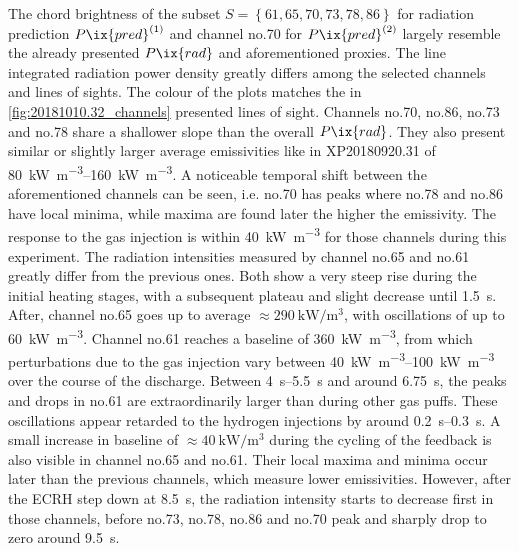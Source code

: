             The chord brightness of the subset $S=\left\{61, 65, 70, 73, 78, 86\right\}$ for radiation prediction $P\ix{pred}^{\left(1\right)}$ and channel no.70 for $P\ix{pred}^{\left(2\right)}$ largely resemble the already presented $P\ix{rad}$ and aforementioned proxies. The line integrated radiation power density greatly differs among the selected channels and lines of sights. The colour of the plots matches the in \cref{fig:20181010.32_channels} presented lines of sight. Channels no.70, no.86, no.73 and no.78 share a shallower slope than the overall $P\ix{rad}$. They also present similar or slightly larger average emissivities like in XP20180920.31 of \SIrange{80}{160}{\kilo\watt\per\cubic\meter}. A noticeable temporal shift between the aforementioned channels can be seen, i.e. no.70 has peaks where no.78 and no.86 have local minima, while maxima are found later the higher the emissivity. The response to the gas injection is within \SI{40}{\kilo\watt\per\cubic\meter} for those channels during this experiment. The radiation intensities measured by channel no.65 and no.61 greatly differ from the previous ones. Both show a very steep rise during the initial heating stages, with a subsequent plateau and slight decrease until \SI{1.5}{\second}. After, channel no.65 goes up to average $\approx\SI{290}{\kilo\watt\per\cubic\meter}$, with oscillations of up to \SI{60}{\kilo\watt\per\cubic\meter}. Channel no.61 reaches a baseline of \SI{360}{\kilo\watt\per\cubic\meter}, from which perturbations due to the gas injection vary between \SIrange{40}{100}{\kilo\watt\per\cubic\meter} over the course of the discharge. Between \SIrange{4}{5.5}{\second} and around \SI{6.75}{\second}, the peaks and drops in no.61 are extraordinarily larger than during other gas puffs. These oscillations appear retarded to the hydrogen injections by around \SIrange{0.2}{0.3}{\second}. A small increase in baseline of $\approx\SI{40}{\kilo\watt\per\cubic\meter}$ during the cycling of the feedback is also visible in channel no.65 and no.61. Their local maxima and minima occur later than the previous channels, which measure lower emissivities. However, after the ECRH step down at \SI{8.5}{\second}, the radiation intensity starts to decrease first in those channels, before no.73, no.78, no.86 and no.70 peak and sharply drop to zero around \SI{9.5}{\second}.\\%
